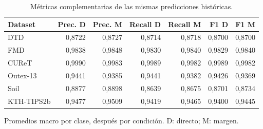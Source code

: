 \begin{table}[!htbp]\centering
\fontsize{8}{10}\selectfont\setlength{\tabcolsep}{4pt}
\caption{Métricas complementarias de las mismas predicciones históricas.}\label{tab:accuracy-secondary-cascade}
\begin{tabular}{@{}lrrrrrr@{}}\toprule
Dataset & Prec. D & Prec. M & Recall D & Recall M & F1 D & F1 M\\\midrule
DTD & 0,8722 & 0,8727 & 0,8714 & 0,8718 & 0,8700 & 0,8700\\
FMD & 0,9838 & 0,9848 & 0,9830 & 0,9840 & 0,9829 & 0,9840\\
CUReT & 0,9990 & 0,9983 & 0,9989 & 0,9982 & 0,9989 & 0,9982\\
Outex-13 & 0,9441 & 0,9385 & 0,9441 & 0,9382 & 0,9426 & 0,9369\\
Soil & 0,8877 & 0,8898 & 0,8639 & 0,8675 & 0,8701 & 0,8734\\
KTH-TIPS2b & 0,9477 & 0,9509 & 0,9419 & 0,9465 & 0,9400 & 0,9445\\
\bottomrule\end{tabular}
\par\smallskip\begin{minipage}{0.98\textwidth}\footnotesize Promedios macro por clase, después por condición. D: directo; M: margen.\end{minipage}
\end{table}
